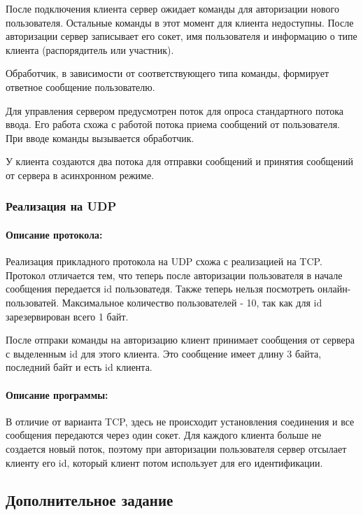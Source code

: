 После подключения клиента сервер ожидает команды для авторизации нового пользователя. Остальные команды в этот момент для клиента недоступны. После авторизации сервер записывает его сокет, имя пользователя и информацию о типе клиента (распорядитель или участник).

Обработчик, в зависимости от соответствующего типа команды, формирует ответное сообщение пользователю.

Для управления сервером предусмотрен поток для опроса стандартного потока ввода. Его работа схожа с работой потока приема сообщений от пользователя. При вводе команды вызывается обработчик. 

У клиента создаются два потока для отправки сообщений и принятия сообщений от сервера в асинхронном режиме. 

\subsubsection{Реализация на UDP}

\paragraph{Описание протокола:}

Реализация прикладного протокола на UDP схожа с реализацией на TCP. Протокол отличается тем, что теперь после авторизации пользователя в начале сообщения передается id пользоватедя. Также теперь нельзя посмотреть онлайн-пользоватей. Максимальное количество пользователей - 10, так как для id зарезервирован всего 1 байт.

После отпраки команды на авторизацию клиент принимает сообщения от сервера с выделенным id для этого клиента. Это сообщение имеет длину 3 байта, последний байт и есть id клиента.

\paragraph{Описание программы:}

В отличие от варианта TCP, здесь не происходит установления соединения и все сообщения передаются через один сокет. Для каждого клиента больше не создается новый поток, поэтому при авторизации пользователя сервер отсылает клиенту его id, который клиент потом использует для его идентификации.

\subsection{Дополнительное задание}

